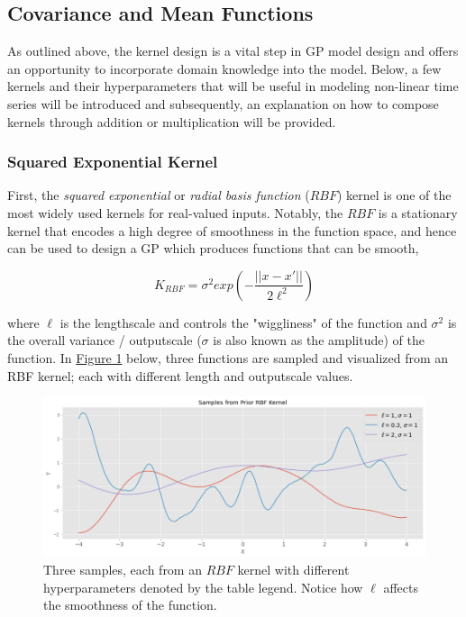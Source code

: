 \subsection{Covariance and Mean Functions}

As outlined above, the kernel design is a vital step in GP model design and offers an opportunity to incorporate domain knowledge into the model. Below, a few kernels and their hyperparameters that will be useful in modeling non-linear time series will be introduced and subsequently, an explanation on how to compose kernels through addition or multiplication will be provided.

\subsubsection{Squared Exponential Kernel}

First, the \textit{squared exponential} or \textit{radial basis function} ($RBF$) kernel is one of the most widely used kernels for real-valued inputs. Notably, the $RBF$ is a stationary kernel that encodes a high degree of smoothness in the function space, and hence can be used to design a GP which produces functions that can be smooth,

\begin{equation}
    K_{RBF} = \sigma^2 exp(-\frac{||x - x'||}{2 \ell^2})
\end{equation}

where $\ell$ is the lengthscale and controls the "wiggliness" of the function and $\sigma^2$ is the overall variance / outputscale  ($\sigma$ is also known as the amplitude) of the function. In \hyperlink{figure.1}{Figure 1} below, three functions are sampled and visualized from an RBF kernel; each with different length and outputscale values.

\begin{figure}[htp]
\centering
\graphicspath{ {./images/} }
\includegraphics[scale=0.49]{images/samples_rbf_prior.png}
\caption{Three samples, each from an $RBF$ kernel with different hyperparameters denoted by the table legend. Notice how $\ell$ affects the smoothness of the function.}
\end{figure}

